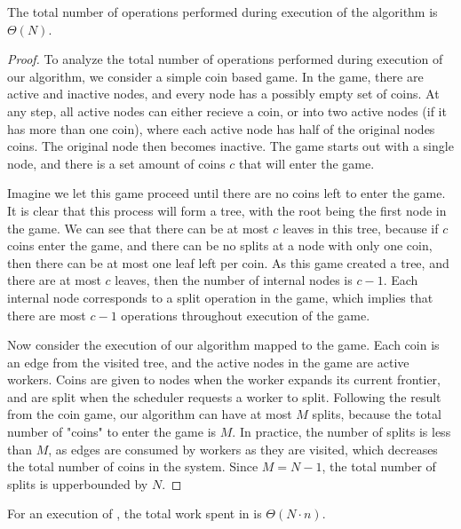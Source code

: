 \begin{theorem}\label{thm:split-count}
  The total number of  operations performed during execution of the algorithm
  is $\Theta(N)$.
\end{theorem}

\begin{proof}

To analyze the total number of  operations performed
during execution of our algorithm, we consider a simple coin based game.
%
In the game, there are active and inactive nodes, and every node has a possibly
empty set of coins.
%
At any step, all active nodes can either recieve a coin, or  into
two active nodes (if it has more than one coin), where each active node has half of the original nodes coins.
%
The original node then becomes inactive.
%
The game starts out with a single node, and there is a set amount of coins $c$ that will enter the game.

Imagine we let this game proceed until there are no coins left to enter the game.
%
It is clear that this process will form a tree, with the root being the first node in the game.
%
We can see that there can be at most $c$ leaves in this tree, because if $c$ coins enter the game,
and there can be no splits at a node with only one coin, then there can be at most one leaf left per coin.
%
As this game created a tree, and there are at most $c$ leaves, then the number of internal nodes is $c-1$.
%
Each internal node corresponds to a split operation in the game, which implies that there are most $c-1$ 
operations throughout execution of the game.

Now consider the execution of our algorithm mapped to the game.
%
Each coin is an edge from the visited tree, and the active nodes in the game are active workers.
%
Coins are given to nodes when the worker expands its current frontier, and are split when the scheduler
requests a worker to split.
%
Following the result from the coin game, our algorithm can have at most $M$ splits, because the total
number of "coins" to enter the game is $M$.
%
In practice, the number of splits is less than $M$, as edges are consumed by workers as they are visited,
which decreases the total number of coins in the system.
%
Since $M = N - 1$, the total number of splits is upperbounded by $N$.

\end{proof}

\begin{theorem}\label{thm:sched-overhead}
For an execution of \ouralgorithm{}, the total work
spent in  is $\Theta(N \cdot n)$.
\end{theorem}

